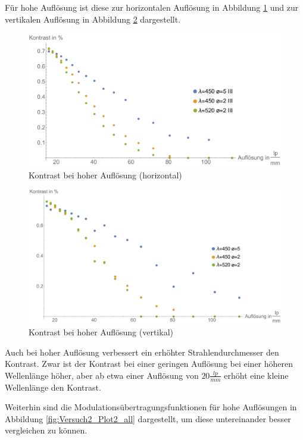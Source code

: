 \begin{minipage}{\linewidth}
Für hohe Auflösung ist diese zur horizontalen Auflösung in Abbildung \ref{fig:Versuch2_Plot2h2} und zur vertikalen Auflösung in Abbildung \ref{fig:Versuch2_Plot2v2} dargestellt.
\begin{figure}[H]
	\centering
\includegraphics[width=1.0\linewidth]{IMAGE/Versuch2Plot2horizontal2.pdf}
	\caption{Kontrast bei hoher Auflösung (horizontal)}
	\label{fig:Versuch2_Plot2h2}
\end{figure} 

\begin{figure}[H]
	\centering
\includegraphics[width=1.0\linewidth]{IMAGE/Versuch2Plot2vertikal2.pdf}
	\caption{Kontrast bei hoher Auflösung (vertikal)}
	\label{fig:Versuch2_Plot2v2}
\end{figure} 
Auch bei hoher Auflösung verbessert ein erhöhter Strahlendurchmesser  den Kontrast. Zwar ist der Kontrast bei einer geringen Auflösung bei einer höheren Wellenlänge höher, aber ab etwa einer Auflösung von $20 \frac{lp}{mm}$ erhöht eine kleine Wellenlänge den Kontrast.
\end{minipage}

Weiterhin sind die Modulationsübertragungsfunktionen für hohe Auflösungen in Abbildung \ref{fig:Versuch2_Plot2_all} dargestellt, um diese untereinander besser vergleichen zu können.

